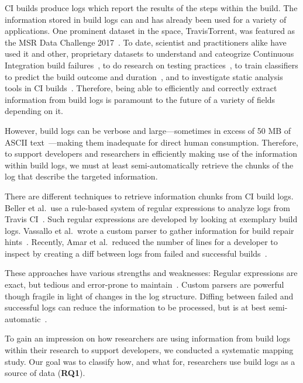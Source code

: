 CI builds produce logs which report the results of the steps within
the build.
The information stored in build logs can and has
already been used for a variety of applications.
One prominent dataset
in the space, TravisTorrent, was featured as the MSR Data Challenge
2017~\cite{msr17challenge}.
To date, scientist and practitioners alike
have used it and other, proprietary datasets to understand and
cateogrize Continuous Integration build
failures~\cite{islam2017insights}, to do research on testing
practices~\cite{orellana2017differences}, to train classifiers to
predict the build outcome and
duration~\cite{ni2017cost,bisong2017built,machalica2019predictive},
and to investigate static analysis tools in CI
builds~\cite{zampetti2017open}.
Therefore, being able to efficiently
and correctly extract information from build logs is paramount to the
future of a variety of fields depending on it.

However, build logs can be verbose and large---sometimes in excess of
50 MB of ASCII text~\cite{beller2017oops}---making them inadequate
for direct human consumption.
Therefore, to support developers and
researchers in efficiently making use of the information within build
logs, we must at least semi-automatically retrieve the chunks of the
log that describe the targeted information.

There are different techniques to retrieve information chunks from CI
build logs.
Beller et al.\ use a rule-based system of regular
expressions to analyze logs from Travis CI~\cite{beller2017oops}.
Such regular expressions are developed by looking at exemplary build
logs.
Vassallo et al.\ wrote a custom parser to gather information
for build repair hints~\cite{vassallo2018un-break}.
Recently, Amar et
al.\ reduced the number of lines for a developer to inspect by
creating a diff between logs from failed and successful
builds~\cite{amar2019mining}.

These approaches have various strengths and weaknesses: Regular
expressions are exact, but tedious and error-prone to
maintain~\cite{michael2019regexes}.
Custom parsers are powerful
though fragile in light of changes in the log structure.
Diffing
between failed and successful logs can reduce the information to be
processed, but is at best semi-automatic~\cite{amar2019mining}.

To gain an impression on how researchers are using information from
build logs within their research to support
developers, we conducted a systematic mapping study.
Our goal was to classify how, and what for, researchers use build logs as
a source of data (\textbf{RQ1}).

